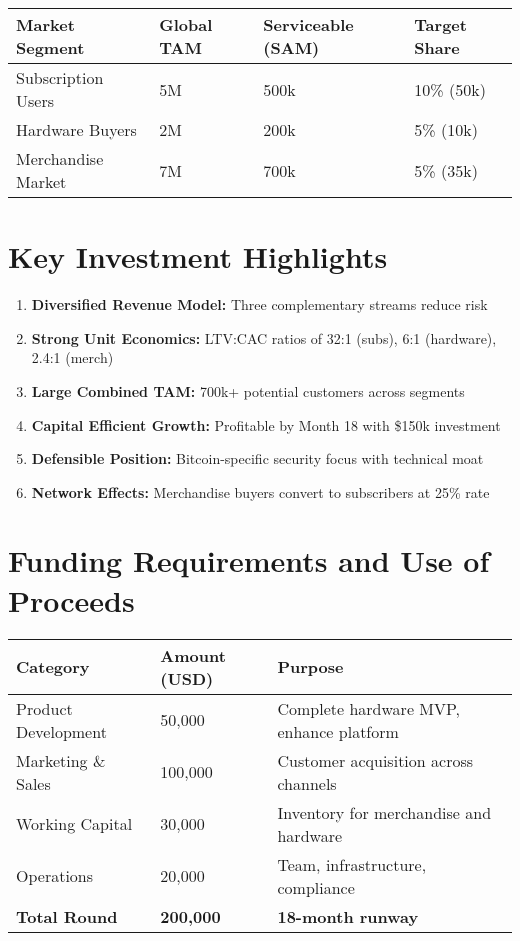 \documentclass[11pt]{article}
\begin{document}
\begin{table}[htbp]
\centering
\begin{tabularx}{\linewidth}{l Y Y Y}
\toprule
Market Segment & Global TAM & Serviceable (SAM) & Target Share \\\midrule
Subscription Users & 5M & 500k & 10\% (50k) \\
Hardware Buyers & 2M & 200k & 5\% (10k) \\
Merchandise Market & 7M & 700k & 5\% (35k) \\
\bottomrule
\end{tabularx}
\end{table}

\section{Key Investment Highlights}

\begin{enumerate}
  \item \textbf{Diversified Revenue Model:} Three complementary streams reduce risk
  \item \textbf{Strong Unit Economics:} LTV:CAC ratios of 32:1 (subs), 6:1 (hardware), 2.4:1 (merch)
  \item \textbf{Large Combined TAM:} 700k+ potential customers across segments
  \item \textbf{Capital Efficient Growth:} Profitable by Month 18 with \$150k investment
  \item \textbf{Defensible Position:} Bitcoin-specific security focus with technical moat
  \item \textbf{Network Effects:} Merchandise buyers convert to subscribers at 25\% rate
\end{enumerate}

\section{Funding Requirements and Use of Proceeds}

\begin{table}[htbp]
\centering
\begin{tabularx}{\linewidth}{l Y Y}
\toprule
Category & Amount (USD) & Purpose \\\midrule
Product Development & 50,000 & Complete hardware MVP, enhance platform \\
Marketing \& Sales & 100,000 & Customer acquisition across channels \\
Working Capital & 30,000 & Inventory for merchandise and hardware \\
Operations & 20,000 & Team, infrastructure, compliance \\
\textbf{Total Round} & \textbf{200,000} & \textbf{18-month runway} \\
\bottomrule
\end{tabularx}
\end{table}
\end{document}
